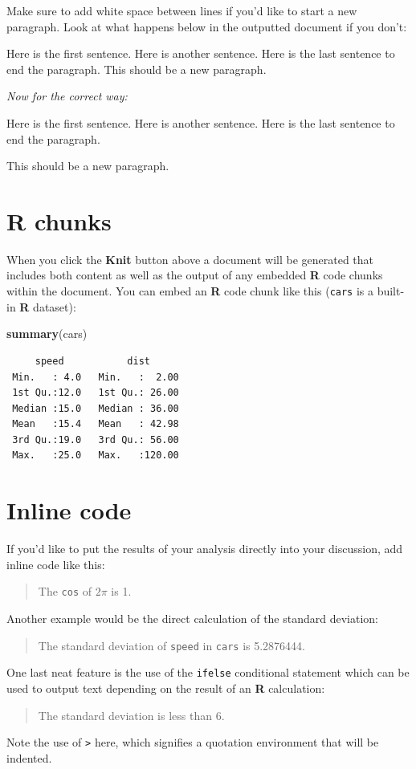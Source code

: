 \documentclass [11pt, proquest] {uwthesis}[2015/03/03]
\newenvironment{Shaded}{}{}
\newcommand{\KeywordTok}[1]{\textcolor[rgb]{0.00,0.44,0.13}{\textbf{{#1}}}}
\newcommand{\NormalTok}[1]{{#1}}
\begin{document}
Make sure to add white space between lines if you'd like to start a new
paragraph. Look at what happens below in the outputted document if you
don't:

Here is the first sentence. Here is another sentence. Here is the last
sentence to end the paragraph. This should be a new paragraph.

\emph{Now for the correct way:}

Here is the first sentence. Here is another sentence. Here is the last
sentence to end the paragraph.

This should be a new paragraph.

\hypertarget{r-chunks}{\section{R chunks}\label{r-chunks}}

When you click the \textbf{Knit} button above a document will be
generated that includes both content as well as the output of any
embedded \textbf{R} code chunks within the document. You can embed an
\textbf{R} code chunk like this (\texttt{cars} is a built-in \textbf{R}
dataset):
\begin{Shaded}
\begin{Highlighting}[]
\KeywordTok{summary}\NormalTok{(cars)}
\end{Highlighting}
\end{Shaded}
\begin{verbatim}
     speed           dist       
 Min.   : 4.0   Min.   :  2.00  
 1st Qu.:12.0   1st Qu.: 26.00  
 Median :15.0   Median : 36.00  
 Mean   :15.4   Mean   : 42.98  
 3rd Qu.:19.0   3rd Qu.: 56.00  
 Max.   :25.0   Max.   :120.00  
\end{verbatim}
\section{Inline code}\label{inline-code}

If you'd like to put the results of your analysis directly into your
discussion, add inline code like this:
\begin{quote}
The \texttt{cos} of \(2 \pi\) is 1.
\end{quote}
Another example would be the direct calculation of the standard
deviation:
\begin{quote}
The standard deviation of \texttt{speed} in \texttt{cars} is 5.2876444.
\end{quote}
One last neat feature is the use of the \texttt{ifelse} conditional
statement which can be used to output text depending on the result of an
\textbf{R} calculation:
\begin{quote}
The standard deviation is less than 6.
\end{quote}
Note the use of \texttt{\textgreater{}} here, which signifies a
quotation environment that will be indented.
\end{document}
